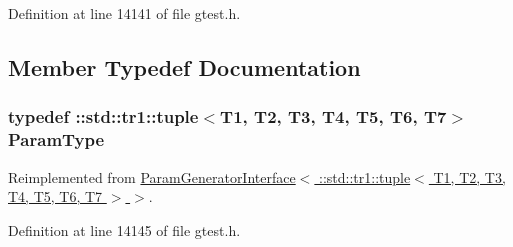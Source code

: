 \-Definition at line 14141 of file gtest.\-h.



\subsection{\-Member \-Typedef \-Documentation}
\hypertarget{classtesting_1_1internal_1_1CartesianProductGenerator7_a18469e04d44a379d754ff5044f09531f}{
\subsubsection[{\-Param\-Type}]{\setlength{\rightskip}{0pt plus 5cm}typedef \-::{\bf std\-::tr1\-::tuple}$<$\-T1, \-T2, \-T3, \-T4, \-T5, \-T6, \-T7$>$ {\bf \-Param\-Type}}}\label{d1/d5a/classtesting_1_1internal_1_1CartesianProductGenerator7_a18469e04d44a379d754ff5044f09531f}


\-Reimplemented from \hyperlink{classtesting_1_1internal_1_1ParamGeneratorInterface_a1c17d95e5946c3f940ece2bd9165fc34}{\-Param\-Generator\-Interface$<$ \-::std\-::tr1\-::tuple$<$ T1, T2, T3, T4, T5, T6, T7 $>$ $>$}.



\-Definition at line 14145 of file gtest.\-h.



